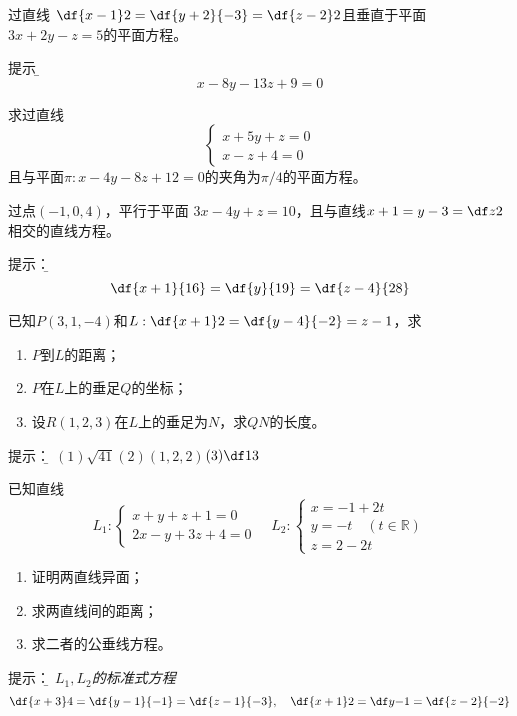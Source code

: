 \begin{frame}
	\linespread{1.2}
	\;过直线
	$\df{x-1}2=\df{y+2}{-3}=\df{z-2}2$且垂直于平面
	$3x+2y-z=5$的平面方程。
	
	\pause\alert{提示：}{\b  
	$$x-8y-13z+9=0$$}
	
	\pause
	\;求过直线
	$$\left\{\begin{array}{l}
		x+5y+z=0\\
		x-z+4=0
	\end{array}\right.$$
	且与平面$\pi:x-4y-8z+12=0$的夹角为$\pi/4$的平面方程。
\end{frame}

\begin{frame}
	\linespread{1.2}
	\;过点$(-1,0,4)$，平行于平面
	$3x-4y+z=10$，且与直线$x+1=y-3=\df z2$
	相交的直线方程。

	\pause\alert{提示：}\it\b
	$$\df{x+1}{16}=\df{y}{19}=\df{z-4}{28}$$
\end{frame}

\begin{frame}
	\linespread{1.2}
	\;已知$P(3,1,-4)$和$L:\df{x+1}2=\df{y-4}{-2}=z-1$，求
	\begin{enumerate}
	  \item $P$到$L$的距离；
	  \item $P$在$L$上的垂足$Q$的坐标；
	  \item 设$R(1,2,3)$在$L$上的垂足为$N$，求$QN$的长度。
	\end{enumerate}
	
	\pause\alert{提示：}\it\b
	$(1)\sqrt{41}$\quad$(2)(1,2,2)$\quad$(3)\df13$  
\end{frame}

\begin{frame}
	\linespread{1.2}
	\;已知直线
	$$L_1:\left\{\begin{array}{l}
		x+y+z+1=0\\
		2x-y+3z+4=0
	\end{array}\right.
	\quad
	L_2:\left\{\begin{array}{l}
		x=-1+2t\\
		y=-t\quad(t\in\mathbb{R})\\
		z=2-2t
	\end{array}\right.
	$$
	\begin{enumerate}[(1)]
	  \item 证明两直线异面；
	  \item 求两直线间的距离；
	  \item 求二者的公垂线方程。
	\end{enumerate}
	
	\pause\alert{提示：}\it\b
	$L_1,L_2$的标准式方程
	$$\df{x+3}4=\df{y-1}{-1}=\df{z-1}{-3},\quad
	\df{x+1}2=\df y{-1}=\df{z-2}{-2}$$
\end{frame}

